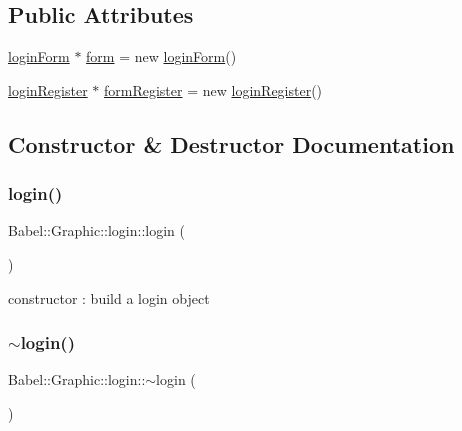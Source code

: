 \subsection*{Public Attributes}
\begin{DoxyCompactItemize}
\item 
\hyperlink{classBabel_1_1Graphic_1_1loginForm}{login\+Form} $\ast$ \hyperlink{classBabel_1_1Graphic_1_1login_addde64c3881ad4b65ffbe2ccfbf11d13}{form} = new \hyperlink{classBabel_1_1Graphic_1_1loginForm}{login\+Form}()
\item 
\hyperlink{classBabel_1_1Graphic_1_1loginRegister}{login\+Register} $\ast$ \hyperlink{classBabel_1_1Graphic_1_1login_a3dba6799011fb1d05dad52a689e72534}{form\+Register} = new \hyperlink{classBabel_1_1Graphic_1_1loginRegister}{login\+Register}()
\end{DoxyCompactItemize}


\subsection{Constructor \& Destructor Documentation}
\mbox{\label{classBabel_1_1Graphic_1_1login_ab2ea74a5e1e3e2aa38cd351b2fbec82c}} 
\subsubsection{\texorpdfstring{login()}{login()}}
{\footnotesize\ttfamily Babel\+::\+Graphic\+::login\+::login (\begin{DoxyParamCaption}{ }\end{DoxyParamCaption})}

constructor \+: build a login object \mbox{\label{classBabel_1_1Graphic_1_1login_ae2eb7c20c6ed139244c1dd687ef0e93f}} 
\subsubsection{\texorpdfstring{$\sim$login()}{~login()}}
{\footnotesize\ttfamily Babel\+::\+Graphic\+::login\+::$\sim$login (\begin{DoxyParamCaption}{ }\end{DoxyParamCaption})\hspace{0.3cm}{\ttfamily [default]}}

